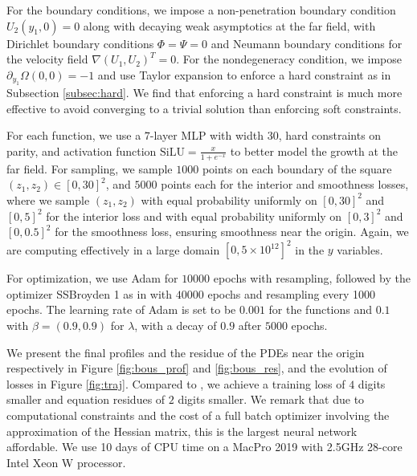 \documentclass[12pt]{caltech_thesis}
\numberwithin{equation}{section}
\begin{document}
For the boundary conditions, we impose a non-penetration boundary condition $U_2(y_1,0)=0$ along with decaying weak asymptotics at the far field, with Dirichlet boundary conditions $\Phi=\Psi=0$ and Neumann boundary conditions for the velocity field $\nabla(U_1,U_2)^T=0$. For the nondegeneracy condition, we impose $\partial_{y_1}\Omega(0,0)=-1$ and use Taylor expansion to enforce a hard constraint as in Subsection \ref{subsec:hard}. We find that enforcing a hard constraint is much more effective to avoid converging to a trivial solution than enforcing soft constraints.

For each function, we use a $7$-layer MLP with width $30$, hard constraints on parity, and activation function $\mathrm{SiLU}=\frac{x}{1 + e^{-x}}$ to better model the growth at the far field. For sampling, we sample $1000$ points on each boundary of the square $(z_1,z_2)\in[0,30]^2$, and $5000$ points each for the interior and smoothness losses, where we sample  $(z_1,z_2)$ with equal probability uniformly on $[0,30]^2$ and $[0,5]^2$ for the interior loss and with equal probability uniformly on $[0,3]^2$ and $[0,0.5]^2$ for the smoothness loss, ensuring smoothness near the origin. Again, we are computing effectively in a large domain $[0,5\times 10^{12}]^2$ in the $y$ variables.

For optimization, we use Adam for $10000$ epochs with resampling, followed by the optimizer SSBroyden 1 as in \cite{urban2025unveiling} with $40000$ epochs and resampling every 1000 epochs. The learning rate of Adam is set to be $0.001$ for the functions and $0.1$ with $\beta=(0.9,0.9)$ for $\lambda$, with a decay of $0.9$ after $5000$ epochs.

We present the final profiles and the residue of the PDEs near the origin respectively in Figure \ref{fig:bous_prof} and \ref{fig:bous_res}, and the evolution of losses in Figure \ref{fig:traj}.
Compared to \cite{wang2023asymptotic}, we achieve a training loss of $4$ digits smaller and equation residues of $2$ digits smaller. We remark that due to computational constraints and the cost of a full batch optimizer involving the approximation of the Hessian matrix, this is the largest neural network affordable. We use 10 days of CPU time on a MacPro 2019 with 2.5GHz 28-core Intel Xeon W processor.
\end{document}
